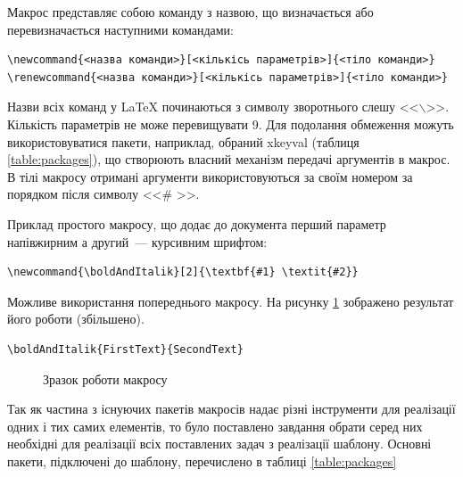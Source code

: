 Макрос представляє собою команду з назвою, що визначається або перевизначається наступними командами:
\begin{verbatim}
\newcommand{<назва команди>}[<кількісь параметрів>]{<тіло команди>}
\renewcommand{<назва команди>}[<кількісь параметрів>]{<тіло команди>}
\end{verbatim}

Назви всіх команд у \LaTeX{} починаються з символу зворотнього слешу <<$\backslash$>>. Кількість параметрів не може перевищувати 9. Для подолання обмеження можуть використовуватися пакети, наприклад, обраний xkeyval (таблиця \ref{table:packages}), що створюють власний механізм передачі аргументів в макрос. В тілі макросу отримані аргументи використовуються за своїм номером за порядком після символу <<\# >>.

Приклад простого макросу, що додає до документа перший параметр напівжирним а другий~--- курсивним шрифтом:
\begin{verbatim}
\newcommand{\boldAndItalik}[2]{\textbf{#1} \textit{#2}}
\end{verbatim}

Можливе використання попереднього макросу. На рисунку \ref{ris:image} зображено результат його роботи (збільшено).
\begin{verbatim}
\boldAndItalik{FirstText}{SecondText}
\end{verbatim}


\begin{figure}[h]
\caption{Зразок роботи макросу}
\label{ris:image}
\end{figure}

Так як частина з існуючих пакетів макросів надає різні інструменти для реалізації одних і тих самих елементів, то було поставлено завдання обрати серед них необхідні для реалізації всіх поставлених задач з реалізації шаблону. Основні пакети, підключені до шаблону, перечислено в таблиці \ref{table:packages}


